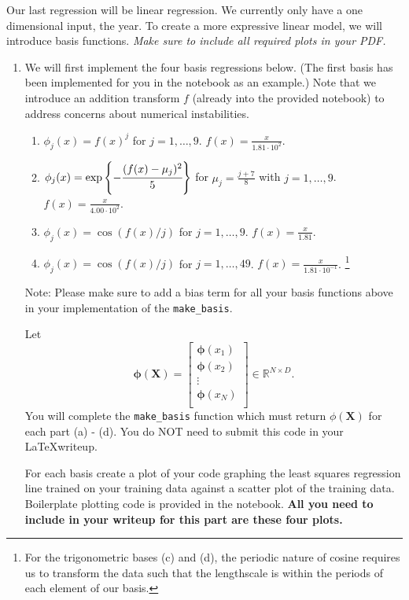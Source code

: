 \documentclass[submit]{harvardml}
\begin{document}

\newpage
\begin{problem}

Our last regression will be linear regression.  We currently only have
a one dimensional input, the year.  To create a more expressive linear
model, we will introduce basis functions.
\vspace{1em}
\noindent\emph{Make sure to include all required plots in your PDF.}

\begin{enumerate}
\item 
We will first implement the four basis regressions below. (The first basis has been implemented for you in the notebook as an example.) Note that we introduce an addition transform $f$ (already into the provided notebook) to address concerns about numerical instabilities.
\begin{enumerate}
  \item $\phi_j(x)= f(x)^j$ for $j=1,\ldots, 9$. $f(x) = \frac{x}{1.81 \cdot 10^{2}}.$
  \item $\phi_j(x) = \exp\left\{-\cfrac{(f(x)-\mu_j)^2}{5}\right\}$ for $\mu_j=\frac{j + 7}{8}$ with $j=1,\ldots, 9$. $f(x) = \frac{x}{4.00 \cdot 10^{2}}.$
  \item $\phi_j(x) =  \cos(f(x) / j)$ for $j=1, \ldots, 9$. $f(x) = \frac{x}{1.81}$.
  \item $\phi_j(x) = \cos(f(x) / j)$ for $j=1, \ldots, 49$. $f(x) = \frac{x}{1.81 \cdot 10^{-1}}$. \footnote{For the trigonometric bases (c) and (d), the periodic nature of
cosine requires us to transform the data such that the 
lengthscale is within the periods of each element of our basis.}
\end{enumerate}

{\footnotesize * Note: Please make sure to add a bias term for
all your basis functions above in your implementation of the 
\verb|make_basis|.}

Let 
$$ \mathbf{\phi}(\mathbf{X}) = 
\begin{bmatrix} 
\mathbf{\phi}(x_1) \\
\mathbf{\phi}(x_2) \\
\vdots \\
\mathbf{\phi}(x_N) \\
\end{bmatrix} \in \mathbb{R}^{N\times D}.$$
You will complete the \verb|make_basis| function which must return
$\phi(\mathbf{X})$ for each part 
(a) - (d). You do NOT need to submit this
code in your \LaTeX writeup.

For each basis create a plot of your code graphing the least squares
regression line trained on your training data against a scatter plot
of the training data. Boilerplate plotting code is provided in the
notebook.
\textbf{All you need to include 
in your writeup for this part are these four plots.}
\vspace{1em}
\end{enumerate}
\end{problem}
\end{document}
